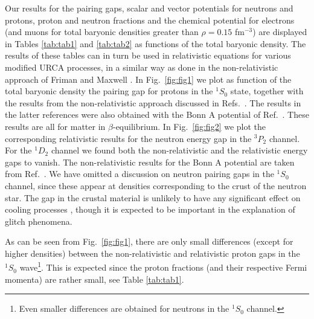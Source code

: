 Our results for the pairing gaps, scalar and vector potentials
for neutrons and protons, proton and neutron fractions and the chemical
potential for electrons (and muons for total baryonic 
densities greater than $\rho=0.15$ fm$^{-3}$)
are displayed in Tables \ref{tab:tab1} and
\ref{tab:tab2} as functions of the total baryonic density.
The results  of these tables can in turn be used in relativistic equations
for various  modified URCA processes, in a similar way as done
in the non-relativistic approach of Friman and Maxwell \cite{fm79}. 
In Fig.\ \ref{fig:fig1} we plot as function of the total baryonic 
density the pairing gap for protons in the $^1S_0$
state, together with the results from the non-relativistic 
approach discussed in  Refs.\
\cite{eeho96b,eeho96c}. The results in the latter
references were  also obtained with the Bonn A potential of
Ref.\ \cite{mac89}. These results are all 
for matter in $\beta$-equilibrium. In Fig.\ \ref{fig:fig2} we plot the 
corresponding relativistic 
results for the neutron energy gap in the $^3P_2$ channel. For the 
$^1D_2$ channel we found both the non-relativistic and the relativistic
energy gaps to vanish. 
The non-relativistic
results for  the Bonn A potential are taken from Ref.\ \cite{eeho96a}. 
We have omitted a discussion on neutron pairing gaps in the
$^1S_0$ channel, since these appear at densities corresponding 
to the crust of the neutron star. The gap in the crustal material 
is unlikely
to have any significant effect on cooling processes \cite{pr95}, though
it is expected to be important in the explanation of glitch phenomena.


As can be seen from Fig.\ \ref{fig:fig1}, there are only small differences
(except for higher densities)
between the non-relativistic and relativistic proton gaps in the 
$^1S_0$ wave\footnote{Even smaller differences are obtained
for neutrons in the $^1S_0$ channel.}. 
This is expected
since the proton fractions (and their respective
Fermi momenta) are rather
small, see Table \ref{tab:tab1}.


